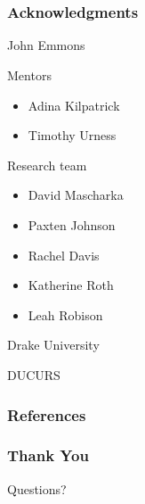 \documentclass{beamer}
\begin{document}
\section{}
\begin{frame}
	\frametitle{Acknowledgments}
		\begin{block} {John Emmons}
		\end{block}
		\begin{block} {Mentors}
		\begin{multicols}{2}
		\begin{itemize}
			\item Adina Kilpatrick
			\item Timothy Urness
		\end{itemize}
		\end{multicols}
		\end{block}
		\begin{block} {Research team}
		\begin{multicols}{2}
		\begin{itemize}
			\item David Mascharka
			\item Paxten Johnson
			\item Rachel Davis
			\item Katherine Roth
			\item Leah Robison
		\end{itemize}
		\end{multicols}
		\end{block}
		\begin{block} {Drake University}
		\end{block}
		\begin{block} {DUCURS}
		\end{block}
\end{frame}

\begin{frame}[t,allowframebreaks]
  \frametitle{References}
  \printbibliography
\end{frame}

\begin{frame}
	\frametitle{Thank You} 
	\begin{block}
		{\huge Questions?}
	\end{block}
\end{frame}
\end{document}
